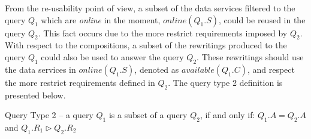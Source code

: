 From the re-usability point of view, a subset of the data services filtered to the query $Q_{1}$ which are \textit{online} in the moment, $online(Q_{1}.S)$, could be reused in the query $Q_{2}$. This fact occurs due to the more restrict requirements imposed by $Q_{2}$.
With respect to the compositions, a subset of the rewritings produced to the query $Q_{1}$ could also be used to answer the query $Q_{2}$. These rewritings should use the data services in $online(Q_{1}.S)$, denoted as $available(Q_{1}.C)$, and respect the more restrict requirements defined in $Q_{2}$. 
The query type 2 definition is presented below.

\begin{definition}\label{def:qt2}
Query Type 2 -- a query $Q_{1}$ is a subset of a query $Q_{2}$, if and only if: $Q_{1}.A = Q_{2}.A$ and $Q_{1}.R_{1} \rhd Q_{2}.R_{2}$
\end{definition}
